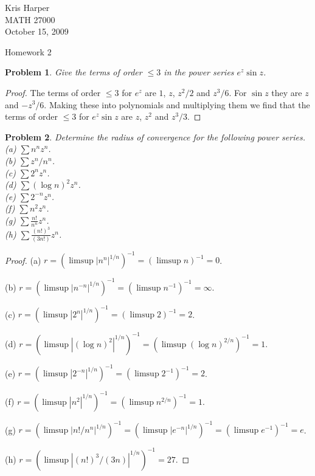 \documentclass{article}
\newtheorem{problem}{Problem}
\begin{document}
\begin{flushright}
Kris Harper\\

MATH 27000\\

October 15, 2009
\end{flushright}

\begin{center}
Homework 2
\end{center}

\begin{problem}
Give the terms of order $\leq 3$ in the power series $e^z \sin z$.
\end{problem}
\begin{proof}
The terms of order $\leq 3$ for $e^z$ are $1$, $z$, $z^2/2$ and $z^3/6$. For $\sin z$ they are $z$ and $-z^3/6$. Making these into polynomials and multiplying them we find that the terms of order $\leq 3$ for $e^z \sin z$ are $z$, $z^2$ and $z^3/3$.
\end{proof}

\begin{problem}
Determine the radius of convergence for the following power series.\\
(a) $\sum n^n z^n$.\\
(b) $\sum z^n/n^n$.\\
(c) $\sum 2^n z^n$.\\
(d) $\sum (\log n)^2 z^n$.\\
(e) $\sum 2^{-n} z^n$.\\
(f) $\sum n^2 z^n$.\\
(g) $\sum \frac{n!}{n^n} z^n$.\\
(h) $\sum \frac{(n!)^3}{(3n!)} z^n$.\\
\end{problem}
\begin{proof}
(a) $r = (\limsup |n^n|^{1/n})^{-1} = (\limsup n)^{-1} = 0$.

(b) $r = (\limsup |n^{-n}|^{1/n})^{-1} = (\limsup n^{-1})^{-1} = \infty$.

(c) $r = (\limsup |2^n|^{1/n})^{-1} = (\limsup 2)^{-1} = 2$.

(d) $r = (\limsup |(\log n)^2|^{1/n})^{-1} = (\limsup (\log n)^{2/n})^{-1} = 1$.

(e) $r = (\limsup |2^{-n}|^{1/n})^{-1} = (\limsup 2^{-1})^{-1} = 2$.

(f) $r = (\limsup |n^2|^{1/n})^{-1} = (\limsup n^{2/n})^{-1} = 1$.

(g) $r = (\limsup |n!/n^n|^{1/n})^{-1} = (\limsup |e^{-n}|^{1/n})^{-1} = (\limsup e^{-1})^{-1} = e$.

(h) $r = (\limsup |(n!)^3/(3n)|^{1/n})^{-1} = 27$.
\end{proof}
\end{document}
